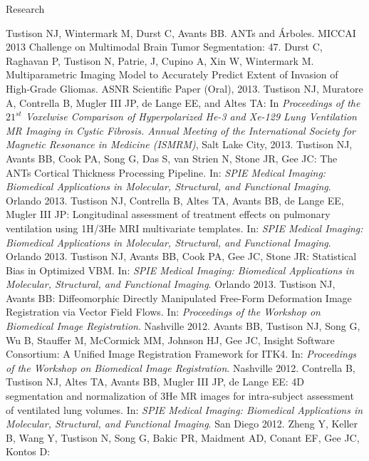 \documentclass{resume}
\begin{document}
\begin{category}{Research}
   \begin{itemize}
   \citemnobullet Tustison NJ, Wintermark M, Durst C, Avants BB. ANTs and \'{A}rboles. MICCAI 2013 Challenge on Multimodal Brain Tumor Segmentation: 47.
   \citemnobullet Durst C, Raghavan P, Tustison N, Patrie, J, Cupino A, Xin W, Wintermark M. Multiparametric Imaging Model to Accurately Predict Extent of Invasion of High-Grade Gliomas. ASNR Scientific Paper (Oral), 2013.
   \citemnobullet Tustison NJ, Muratore A, Contrella B, Mugler III JP, de Lange EE, and Altes TA:  
   In {\em Proceedings of the $21^{st}$ Voxelwise Comparison of Hyperpolarized He-3 and Xe-129 Lung Ventilation MR Imaging in Cystic Fibrosis.  Annual Meeting of the International Society for Magnetic Resonance in Medicine (ISMRM)}, Salt Lake City, 2013.
   \citemnobullet Tustison NJ, Avants BB, Cook PA, Song G, Das S, van Strien N, Stone JR,
   Gee JC:  The ANTs Cortical Thickness Processing Pipeline.  
   In: {\em SPIE Medical Imaging: Biomedical Applications in Molecular, Structural, and 
   Functional Imaging}. Orlando 2013.
   \citemnobullet Tustison NJ, Contrella B, Altes TA, Avants BB, de Lange EE, Mugler III JP:  
   Longitudinal assessment of treatment effects on pulmonary ventilation using 1H/3He MRI 
   multivariate templates.
   In: {\em SPIE Medical Imaging: Biomedical Applications in Molecular, Structural, and 
   Functional Imaging}. Orlando 2013.
   \citemnobullet Tustison NJ, Avants BB, Cook PA, Gee JC, Stone JR:  
   Statistical Bias in Optimized VBM.
   In: {\em SPIE Medical Imaging: Biomedical Applications in Molecular, Structural, and 
   Functional Imaging}. Orlando 2013.
   \citemnobullet Tustison NJ, Avants BB:  Diffeomorphic Directly Manipulated Free-Form Deformation Image   
   Registration via Vector Field Flows.  In:  {\em Proceedings of the Workshop on Biomedical Image 
   Registration}.  Nashville 2012.
   \citemnobullet Avants BB, Tustison NJ, Song G, Wu B, Stauffer M, McCormick MM, Johnson HJ, Gee JC, Insight Software Consortium:  A Unified Image Registration Framework 
   for ITK4.  In:  {\em Proceedings of the Workshop on Biomedical Image 
   Registration}.  Nashville 2012.
   \citemnobullet Contrella B, Tustison NJ, Altes TA, Avants BB, Mugler III JP, de Lange EE: 
   4D segmentation and normalization of 3He MR images for intra-subject assessment of ventilated lung
   volumes. In: {\em SPIE Medical Imaging: Biomedical Applications in Molecular, Structural, and 
   Functional Imaging}. San Diego 2012.   
   \citemnobullet 
   Zheng Y, Keller B, Wang Y, Tustison N, Song G, Bakic PR, Maidment AD, Conant EF, Gee JC, Kontos D:

\end{itemize}
\end{category}
\end{document}
